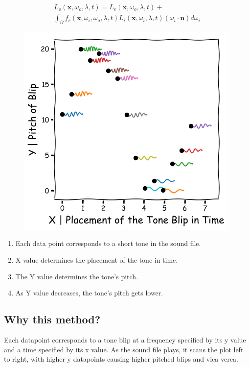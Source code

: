 \documentclass[]{acmsiggraph}
\begin{document}
\begin{multline}\label{eq:kajiya}
L_o \left( \mathbf{x},\omega_o,\lambda,t \right) = L_e\left(\mathbf{x},\omega_o,\lambda,t \right) + \\
   \int_\Omega f_r \left(\mathbf{x},\omega_i,\omega_o,\lambda,t\right) L_i\left(\mathbf{x},\omega_i,\lambda,t\right) \left(\omega_i \cdot \mathbf{n}\right) d\omega_i
\end{multline}

\begin{figure}[h]
\centering
\includegraphics[width=.7\linewidth]{paper/images/Method1.png}
\end{figure}

\begin{enumerate}
\item Each data point corresponds to a short tone in the sound file.
\item X value determines the placement of the tone in time.
\item The Y value determines the tone’s pitch.
\item As Y value decreases, the tone’s pitch gets lower.
\end{enumerate}


\subsection{Why this method? }

Each datapoint corresponds to a tone blip at a frequency specified by its y value and a time specified by its x value. As the sound file plays, it scans the plot left to right, with higher y datapoints causing higher pitched blips and vica verca.
\end{document}
